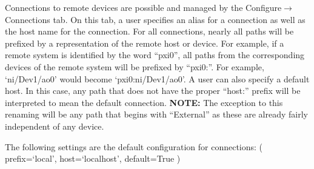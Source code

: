 Connections to remote devices are possible and managed by the
Configure$\rightarrow$Connections tab.  On this tab, a user specifies an alias for a
connection as well as the host name for the connection.
For all connections, nearly all paths will be prefixed by a
representation of the remote host or device.  For example, if a remote system is
identified by the word ``pxi0'', all paths from the corresponding devices of the
remote system will be prefixed by ``pxi0:''.  For example, `ni/Dev1/ao0' would become
`pxi0:ni/Dev1/ao0'.  A user can also specify a default host.  In this case, any
path that does not have the proper ``host:'' prefix will be interpreted to mean
the default connection.
\textbf{NOTE:} The exception to this renaming will be any path that begins with ``External'' as
these are already fairly independent of any device.

The following settings are the default configuration
for connections:
( prefix=`local', host=`localhost', default=True )


